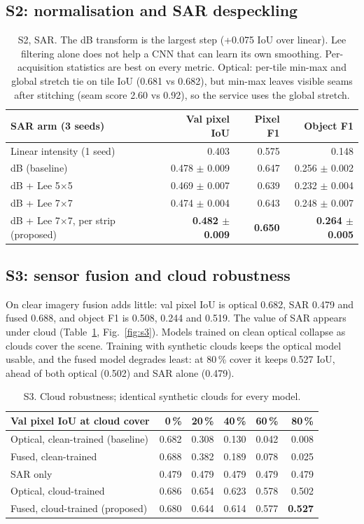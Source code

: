 \documentclass[11pt,a4paper]{article}
\begin{document}
\subsection{S2: normalisation and SAR despeckling}
\begin{table}[h]
\centering\small
\begin{tabular}{lrrr}
\toprule
SAR arm (3 seeds) & Val pixel IoU & Pixel F1 & Object F1\\
\midrule
Linear intensity (1 seed) & 0.403 & 0.575 & 0.148\\
dB (baseline) & 0.478 $\pm$ 0.009 & 0.647 & 0.256 $\pm$ 0.002\\
dB + Lee 5$\times$5 & 0.469 $\pm$ 0.007 & 0.639 & 0.232 $\pm$ 0.004\\
dB + Lee 7$\times$7 & 0.474 $\pm$ 0.004 & 0.643 & 0.248 $\pm$ 0.007\\
dB + Lee 7$\times$7, per strip (proposed) & \textbf{0.482 $\pm$ 0.009} & \textbf{0.650} &
\textbf{0.264 $\pm$ 0.005}\\
\bottomrule
\end{tabular}
\caption{S2, SAR. The dB transform is the largest step (+0.075 IoU over linear). Lee
filtering alone does not help a CNN that can learn its own smoothing. Per-acquisition
statistics are best on every metric. Optical: per-tile min-max and global stretch tie on
tile IoU (0.681 vs 0.682), but min-max leaves visible seams after stitching (seam score
2.60 vs 0.92), so the service uses the global stretch.}
\end{table}

\subsection{S3: sensor fusion and cloud robustness}
On clear imagery fusion adds little: val pixel IoU is optical 0.682, SAR 0.479 and fused
0.688, and object F1 is 0.508, 0.244 and 0.519. The value of SAR appears under cloud
(Table~\ref{tab:s3}, Fig.~\ref{fig:s3}). Models trained on clean optical collapse as clouds
cover the scene. Training with synthetic clouds keeps the optical model usable, and the
fused model degrades least: at 80\,\% cover it keeps 0.527 IoU, ahead of both optical
(0.502) and SAR alone (0.479).

\begin{table}[h]
\centering\small
\begin{tabular}{lrrrrr}
\toprule
Val pixel IoU at cloud cover & 0\,\% & 20\,\% & 40\,\% & 60\,\% & 80\,\%\\
\midrule
Optical, clean-trained (baseline) & 0.682 & 0.308 & 0.130 & 0.042 & 0.008\\
Fused, clean-trained & 0.688 & 0.382 & 0.189 & 0.078 & 0.025\\
SAR only & 0.479 & 0.479 & 0.479 & 0.479 & 0.479\\
Optical, cloud-trained & 0.686 & 0.654 & 0.623 & 0.578 & 0.502\\
Fused, cloud-trained (proposed) & 0.680 & 0.644 & 0.614 & 0.577 & \textbf{0.527}\\
\bottomrule
\end{tabular}
\caption{S3. Cloud robustness; identical synthetic clouds for every model.}
\label{tab:s3}
\end{table}
\end{document}
